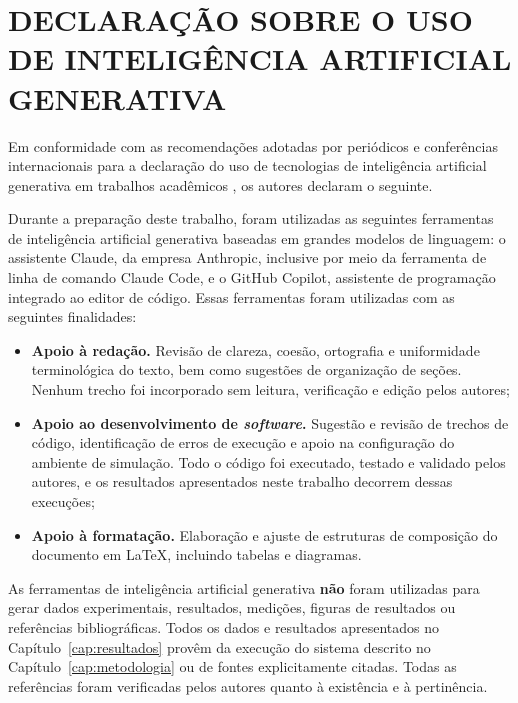 \documentclass[
    12pt,
    openright,
    oneside,
    a4paper,
    english,
    brazil
]{abntex2}
\begin{document}
\chapter*{DECLARAÇÃO SOBRE O USO DE INTELIGÊNCIA ARTIFICIAL GENERATIVA}

Em conformidade com as recomendações adotadas por periódicos e conferências internacionais para a declaração do uso de tecnologias de inteligência artificial generativa em trabalhos acadêmicos \cite{cope2023, elsevier2024}, os autores declaram o seguinte.

Durante a preparação deste trabalho, foram utilizadas as seguintes ferramentas de inteligência artificial generativa baseadas em grandes modelos de linguagem: o assistente Claude, da empresa Anthropic, inclusive por meio da ferramenta de linha de comando Claude Code, e o GitHub Copilot, assistente de programação integrado ao editor de código. Essas ferramentas foram utilizadas com as seguintes finalidades:

\begin{itemize}
    \item \textbf{Apoio à redação.} Revisão de clareza, coesão, ortografia e uniformidade terminológica do texto, bem como sugestões de organização de seções. Nenhum trecho foi incorporado sem leitura, verificação e edição pelos autores;
    \item \textbf{Apoio ao desenvolvimento de \textit{software}.} Sugestão e revisão de trechos de código, identificação de erros de execução e apoio na configuração do ambiente de simulação. Todo o código foi executado, testado e validado pelos autores, e os resultados apresentados neste trabalho decorrem dessas execuções;
    \item \textbf{Apoio à formatação.} Elaboração e ajuste de estruturas de composição do documento em \LaTeX, incluindo tabelas e diagramas.
\end{itemize}

As ferramentas de inteligência artificial generativa \textbf{não} foram utilizadas para gerar dados experimentais, resultados, medições, figuras de resultados ou referências bibliográficas. Todos os dados e resultados apresentados no Capítulo~\ref{cap:resultados} provêm da execução do sistema descrito no Capítulo~\ref{cap:metodologia} ou de fontes explicitamente citadas. Todas as referências foram verificadas pelos autores quanto à existência e à pertinência.
\end{document}
